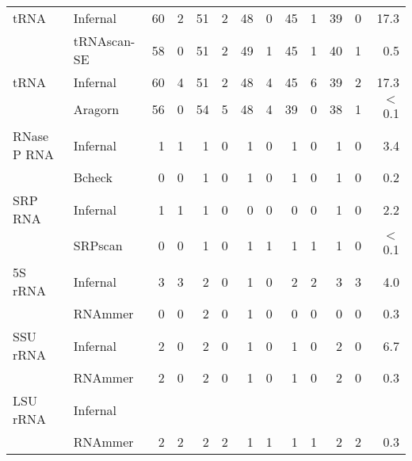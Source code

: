 \begin{table}
\begin{center}
\begin{tabular}{|l|l|rr|rr|rr|rr|rr|r|}
tRNA             &  Infernal         &   60 &   2 &   51 &   2 &   48 &   0 &   45 &   1 &   39 &   0 &    17.3  \\ 
                 &  tRNAscan-SE      &   58 &   0 &   51 &   2 &   49 &   1 &   45 &   1 &   40 &   1 &     0.5  \\ \hline 
tRNA             &  Infernal         &   60 &   4 &   51 &   2 &   48 &   4 &   45 &   6 &   39 &   2 &    17.3  \\ 
                 &  Aragorn          &   56 &   0 &   54 &   5 &   48 &   4 &   39 &   0 &   38 &   1 &  $<$0.1  \\ \hline 
RNase P RNA      &  Infernal         &    1 &   1 &    1 &   0 &    1 &   0 &    1 &   0 &    1 &   0 &     3.4  \\ 
                 &  Bcheck           &    0 &   0 &    1 &   0 &    1 &   0 &    1 &   0 &    1 &   0 &     0.2  \\ \hline 
SRP RNA          &  Infernal         &    1 &   1 &    1 &   0 &    0 &   0 &    0 &   0 &    1 &   0 &     2.2  \\ 
                 &  SRPscan          &    0 &   0 &    1 &   0 &    1 &   1 &    1 &   1 &    1 &   0 &  $<$0.1  \\ \hline 
5S rRNA          &  Infernal         &    3 &   3 &    2 &   0 &    1 &   0 &    2 &   2 &    3 &   3 &     4.0  \\ 
                 &  RNAmmer          &    0 &   0 &    2 &   0 &    1 &   0 &    0 &   0 &    0 &   0 &     0.3  \\ \hline 
SSU rRNA         &  Infernal         &    2 &   0 &    2 &   0 &    1 &   0 &    1 &   0 &    2 &   0 &     6.7  \\ 
                 &  RNAmmer          &    2 &   0 &    2 &   0 &    1 &   0 &    1 &   0 &    2 &   0 &     0.3  \\ \hline 
LSU rRNA         &  Infernal         &      &     &      &     &      &     &      &     &      &     &          \\ 
                 &  RNAmmer          &    2 &   2 &    2 &   2 &    1 &   1 &    1 &   1 &    2 &   2 &     0.3  \\ \hline 
\end{tabular}
\end{center}

\label{tbl:compare-arc}
\end{table}



